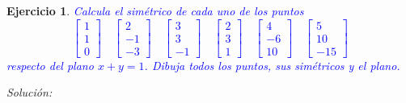 \documentclass{amsart}
\newtheorem{ejer}{Ejercicio}
\begin{document}
\newpage


\begin{ejer}
\textcolor{blue}{Calcula el simétrico de cada uno de los puntos
$$
	\left[\begin{array}{c}1\\1\\0\end{array}\right] \quad
	\left[\begin{array}{c}2\\-1\\-3\end{array}\right] \quad
	\left[\begin{array}{c}3\\3\\-1\end{array}\right] \quad
	\left[\begin{array}{c}2\\3\\1\end{array}\right] \quad
	\left[\begin{array}{c}4\\-6\\10\end{array}\right] \quad
	\left[\begin{array}{c}5\\10\\-15\end{array}\right]
$$ 
respecto del plano $x+y=1$. Dibuja todos los puntos, sus simétricos y el plano.}
\end{ejer}

{\it Solución:}

\end{document}
